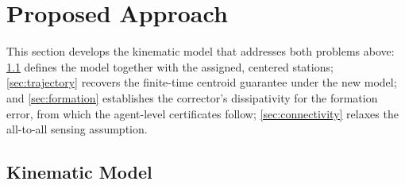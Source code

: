 \documentclass[letterpaper, 10 pt, conference]{ieeeconf}
\begin{document}
\section{Proposed Approach}

This section develops the kinematic model that addresses both
problems above: \cref{sec:model} defines the model together with the
assigned, centered stations; \cref{sec:trajectory} recovers the
finite-time centroid guarantee under the new model; and
\cref{sec:formation} establishes the corrector's dissipativity for the
formation error, from which the agent-level certificates follow;
\cref{sec:connectivity} relaxes the all-to-all sensing assumption.

\subsection{Kinematic Model}
\label{sec:model}
\end{document}
